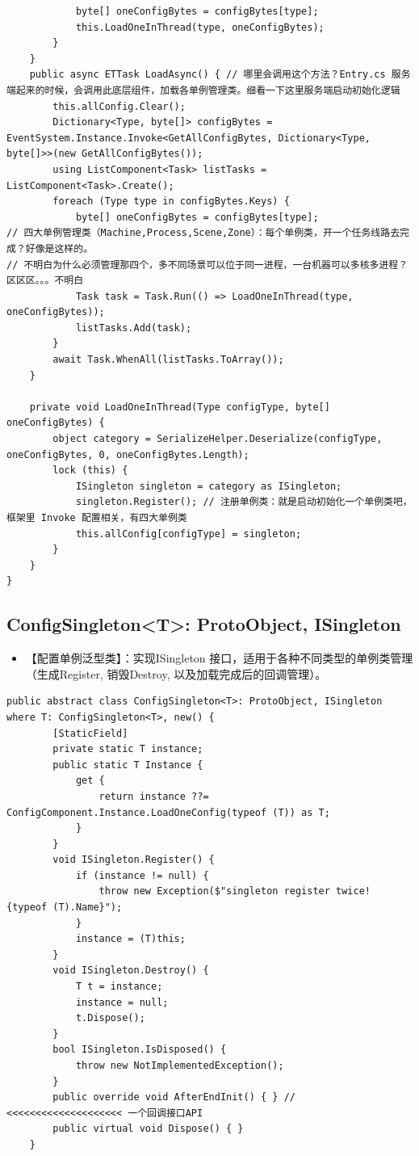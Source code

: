 \documentclass[9pt, b5paper]{article}
\begin{document}
\begin{verbatim}
            byte[] oneConfigBytes = configBytes[type];
            this.LoadOneInThread(type, oneConfigBytes);
        }
    }
    public async ETTask LoadAsync() { // 哪里会调用这个方法？Entry.cs 服务端起来的时候，会调用此底层组件，加载各单例管理类。细看一下这里服务端启动初始化逻辑
        this.allConfig.Clear();
        Dictionary<Type, byte[]> configBytes = EventSystem.Instance.Invoke<GetAllConfigBytes, Dictionary<Type, byte[]>>(new GetAllConfigBytes());
        using ListComponent<Task> listTasks = ListComponent<Task>.Create();
        foreach (Type type in configBytes.Keys) {
            byte[] oneConfigBytes = configBytes[type];
// 四大单例管理类（Machine,Process,Scene,Zone）：每个单例类，开一个任务线路去完成？好像是这样的。
// 不明白为什么必须管理那四个，多不同场景可以位于同一进程，一台机器可以多核多进程？区区区。。。不明白
            Task task = Task.Run(() => LoadOneInThread(type, oneConfigBytes)); 
            listTasks.Add(task);
        }
        await Task.WhenAll(listTasks.ToArray());
    }

    private void LoadOneInThread(Type configType, byte[] oneConfigBytes) {
        object category = SerializeHelper.Deserialize(configType, oneConfigBytes, 0, oneConfigBytes.Length);
        lock (this) {
            ISingleton singleton = category as ISingleton;
            singleton.Register(); // 注册单例类：就是启动初始化一个单例类吧，框架里 Invoke 配置相关，有四大单例类
            this.allConfig[configType] = singleton;
        }
    }
}
\end{verbatim}
\subsection{ConfigSingleton<T>: ProtoObject, ISingleton}
\label{sec-1-8}
\begin{itemize}
\item 【配置单例泛型类】：实现ISingleton 接口，适用于各种不同类型的单例类管理（生成Register, 销毁Destroy, 以及加载完成后的回调管理）。
\end{itemize}
\begin{verbatim}
public abstract class ConfigSingleton<T>: ProtoObject, ISingleton where T: ConfigSingleton<T>, new() {
        [StaticField]
        private static T instance;
        public static T Instance {
            get {
                return instance ??= ConfigComponent.Instance.LoadOneConfig(typeof (T)) as T;
            }
        }
        void ISingleton.Register() {
            if (instance != null) {
                throw new Exception($"singleton register twice! {typeof (T).Name}");
            }
            instance = (T)this;
        }
        void ISingleton.Destroy() {
            T t = instance;
            instance = null;
            t.Dispose();
        }
        bool ISingleton.IsDisposed() {
            throw new NotImplementedException();
        }
        public override void AfterEndInit() { } // <<<<<<<<<<<<<<<<<<<< 一个回调接口API
        public virtual void Dispose() { }
    }
\end{verbatim}
\end{document}

